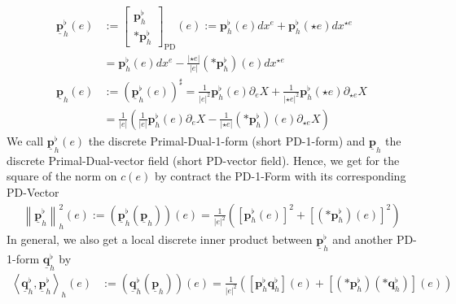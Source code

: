 \documentclass[a4paper,11pt]{scrartcl}
\newcommand{\pflh}{\mathbf{p}^{\flat}_{h}}
\newcommand{\qflh}{\mathbf{q}^{\flat}_{h}}
\newcommand{\PDpflh}{\underline{\mathbf{p}}^{\flat}_{h}}
\newcommand{\PDqflh}{\underline{\mathbf{q}}^{\flat}_{h}}
\newcommand{\PDph}{\underline{\mathbf{p}}_{h}}
\begin{document}
    \begin{align}
      \PDpflh(e) &:= 
                   \begin{bmatrix}
                     \pflh \\ *\pflh 
                   \end{bmatrix}_{\text{PD}} (e)
                   := \pflh(e)dx^{e} + \pflh(\star e)  dx^{\star e} \\
                   &= \pflh(e)dx^{e} - \frac{\left| \star e \right|}{\left| e \right|} \left(*\pflh\right)(e)  dx^{\star e} \\
      \PDph(e) &:= \left(\PDpflh(e)\right)^{\sharp} 
                 = \frac{1}{\left| e \right|^{2}} \pflh(e)\partial_{e}X + \frac{1}{\left|\star e \right|^{2}} \pflh(\star e)\partial_{\star e}X \\
               & =  \frac{1}{\left| e \right|} \left( \frac{1}{\left| e \right|} \pflh(e)\partial_{e}X 
                                                     -\frac{1}{\left|\star e \right|} \left(*\pflh\right)(e) \partial_{\star e}X\right)
    \end{align}
    We call \( \PDpflh(e) \) the discrete Primal-Dual-1-form (short PD-1-form) and \( \PDph \) the discrete Primal-Dual-vector field
    (short PD-vector field).
    Hence, we get for the square of the norm on \( c(e) \) by contract the PD-1-Form with its corresponding PD-Vector
    \begin{align}
      \left\| \PDpflh \right\|_{h}^{2}(e) := \left( \PDpflh\left( \PDph \right) \right)(e)
                                       = \frac{1}{\left| e \right|^{2}}\left( \left[ \pflh(e) \right]^{2} 
                                                                             +\left[ \left(*\pflh\right)(e) \right]^{2}\right)
    \end{align}
    In general, we also get a local discrete inner product between \( \PDpflh \) and another PD-1-form \( \PDqflh \) by
    \begin{align}
      \left\langle \PDqflh , \PDpflh \right\rangle_{h}(e)
          &:= \left( \PDqflh\left( \PDph \right) \right)(e)
                                       = \frac{1}{\left| e \right|^{2}}\left( \left[\pflh\qflh\right](e) 
                                                                             +\left[\left(*\pflh\right)\left(*\qflh\right)\right](e) \right)
    \end{align}
\end{document}
